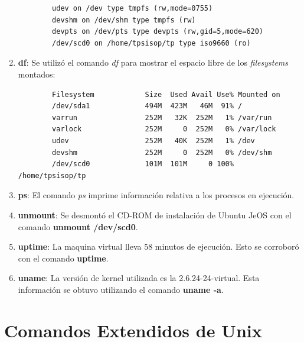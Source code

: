 \documentclass[a4paper,11pt] {article}
\begin{document}
\begin{enumerate}
\begin{verbatim}
		udev on /dev type tmpfs (rw,mode=0755)
		devshm on /dev/shm type tmpfs (rw)
		devpts on /dev/pts type devpts (rw,gid=5,mode=620)
		/dev/scd0 on /home/tpsisop/tp type iso9660 (ro)
	\end{verbatim}
	\item \textbf{df}: Se utiliz\'o el comando \textit{df} para mostrar el espacio libre de los \textit{filesystems} montados:
	\begin{verbatim}
		Filesystem            Size  Used Avail Use% Mounted on
		/dev/sda1             494M  423M   46M  91% /
		varrun                252M   32K  252M   1% /var/run
		varlock               252M     0  252M   0% /var/lock
		udev                  252M   40K  252M   1% /dev
		devshm                252M     0  252M   0% /dev/shm
		/dev/scd0             101M  101M     0 100% /home/tpsisop/tp
	\end{verbatim}
	\item \textbf{ps}: El comando \textit{ps} imprime informaci\'on relativa a los procesos en ejecuci\'on.
	\item \textbf{unmount}: Se desmont\'o el CD-ROM de instalaci\'on de Ubuntu JeOS con el comando \textbf{unmount /dev/scd0}.
	\item \textbf{uptime}: La maquina virtual lleva 58 minutos de ejecuci\'on. Esto se corrobor\'o con el comando \textbf{uptime}.
	\item \textbf{uname}: La versi\'on de kernel utilizada es la 2.6.24-24-virtual. Esta informaci\'on se obtuvo utilizando el comando \textbf{uname -a}.

\end{enumerate}

\section{Comandos Extendidos de Unix}
\end{document}

